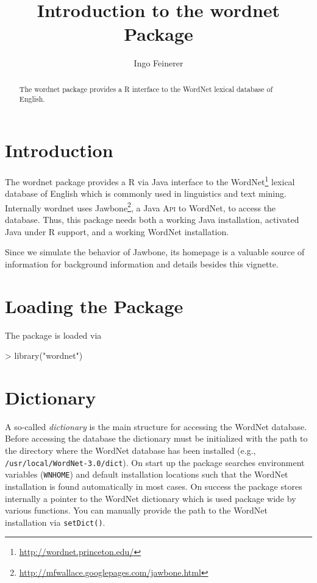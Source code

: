 \documentclass[a4paper]{article}
\newcommand{\strong}[1]{{\normalfont\fontseries{b}\selectfont #1}}
\newcommand{\code}[1]{\mbox{\texttt{#1}}}
\newcommand{\pkg}[1]{\strong{#1}}
\newcommand{\proglang}[1]{\textsf{#1}}
\newcommand{\acronym}[1]{\textsc{#1}}
\begin{document}
\title{Introduction to the \pkg{wordnet} Package}
\author{Ingo Feinerer}
\maketitle
\sloppy

\begin{abstract}
  The \pkg{wordnet} package provides a \proglang{R} interface to the
  \proglang{WordNet} lexical database of English.
\end{abstract}

\section*{Introduction}
The \pkg{wordnet} package provides a \proglang{R} via \proglang{Java}
interface to the
\proglang{WordNet}\footnote{\url{http://wordnet.princeton.edu/}}
lexical database of English which is commonly used in linguistics and
text mining. Internally \pkg{wordnet} uses
\proglang{Jawbone}\footnote{\url{http://mfwallace.googlepages.com/jawbone.html}},
a \proglang{Java} \acronym{Api} to \proglang{WordNet}, to access the
database. Thus, this package needs both a working \proglang{Java}
installation, activated \proglang{Java} under \proglang{R} support, and a
working \proglang{WordNet} installation.

Since we simulate the behavior of \proglang{Jawbone}, its homepage
is a valuable source of information for background information and
details besides this vignette.

\section*{Loading the Package}
The package is loaded via
\begin{Schunk}
\begin{Sinput}
> library("wordnet")
\end{Sinput}
\end{Schunk}

\section*{Dictionary}
A so-called \emph{dictionary} is the main structure for accessing the
\proglang{WordNet} database. Before accessing the database the
dictionary must be initialized with the path to the directory where
the \proglang{WordNet} database has been installed (e.g.,
\code{/usr/local/WordNet-3.0/dict}). On start up the package
searches environment variables (\code{WNHOME}) and default
installation locations such that the \proglang{WordNet} installation is found
automatically in most cases. On success the package stores internally
a pointer to the \proglang{WordNet} dictionary which is used package wide by
various functions. You can manually provide the path to the \proglang{WordNet}
installation via \code{setDict()}.
\end{document}
